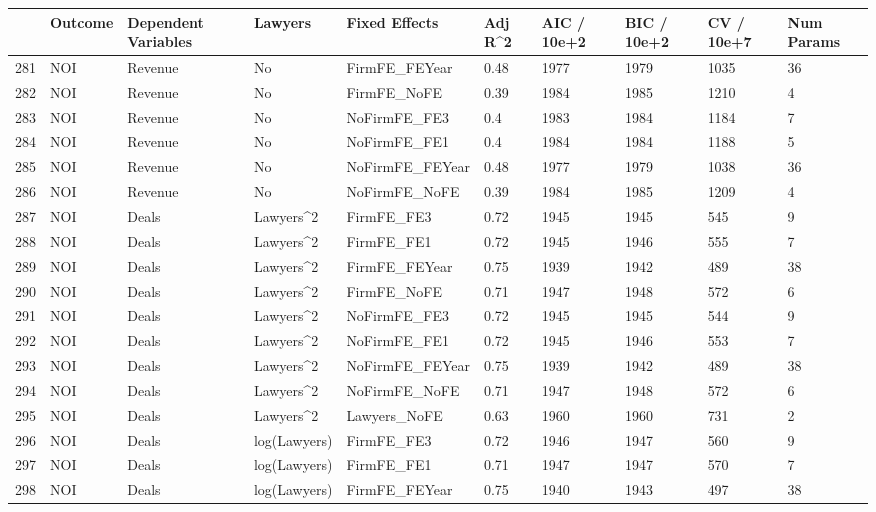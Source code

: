 \documentclass{article}
\begin{document}
\begin{table}[H]
\centering
\begin{tabular}{rlllllllll}
  \hline
 & Outcome & Dependent Variables & Lawyers & Fixed Effects & Adj R^2 & AIC / 10e+2 & BIC / 10e+2 & CV / 10e+7 & Num Params \\ 
  \hline
281 & NOI & Revenue & No & FirmFE\_FEYear & 0.48 & 1977 & 1979 & 1035 & 36 \\ 
  282 & NOI & Revenue & No & FirmFE\_NoFE & 0.39 & 1984 & 1985 & 1210 & 4 \\ 
  283 & NOI & Revenue & No & NoFirmFE\_FE3 & 0.4 & 1983 & 1984 & 1184 & 7 \\ 
  284 & NOI & Revenue & No & NoFirmFE\_FE1 & 0.4 & 1984 & 1984 & 1188 & 5 \\ 
  285 & NOI & Revenue & No & NoFirmFE\_FEYear & 0.48 & 1977 & 1979 & 1038 & 36 \\ 
  286 & NOI & Revenue & No & NoFirmFE\_NoFE & 0.39 & 1984 & 1985 & 1209 & 4 \\ 
  287 & NOI & Deals & Lawyers^2 & FirmFE\_FE3 & 0.72 & 1945 & 1945 & 545 & 9 \\ 
  288 & NOI & Deals & Lawyers^2 & FirmFE\_FE1 & 0.72 & 1945 & 1946 & 555 & 7 \\ 
  289 & NOI & Deals & Lawyers^2 & FirmFE\_FEYear & 0.75 & 1939 & 1942 & 489 & 38 \\ 
  290 & NOI & Deals & Lawyers^2 & FirmFE\_NoFE & 0.71 & 1947 & 1948 & 572 & 6 \\ 
  291 & NOI & Deals & Lawyers^2 & NoFirmFE\_FE3 & 0.72 & 1945 & 1945 & 544 & 9 \\ 
  292 & NOI & Deals & Lawyers^2 & NoFirmFE\_FE1 & 0.72 & 1945 & 1946 & 553 & 7 \\ 
  293 & NOI & Deals & Lawyers^2 & NoFirmFE\_FEYear & 0.75 & 1939 & 1942 & 489 & 38 \\ 
  294 & NOI & Deals & Lawyers^2 & NoFirmFE\_NoFE & 0.71 & 1947 & 1948 & 572 & 6 \\ 
  295 & NOI & Deals & Lawyers^2 & Lawyers\_NoFE & 0.63 & 1960 & 1960 & 731 & 2 \\ 
  296 & NOI & Deals & log(Lawyers) & FirmFE\_FE3 & 0.72 & 1946 & 1947 & 560 & 9 \\ 
  297 & NOI & Deals & log(Lawyers) & FirmFE\_FE1 & 0.71 & 1947 & 1947 & 570 & 7 \\ 
  298 & NOI & Deals & log(Lawyers) & FirmFE\_FEYear & 0.75 & 1940 & 1943 & 497 & 38 \\ 

\end{tabular}
\end{table}
\end{document}
